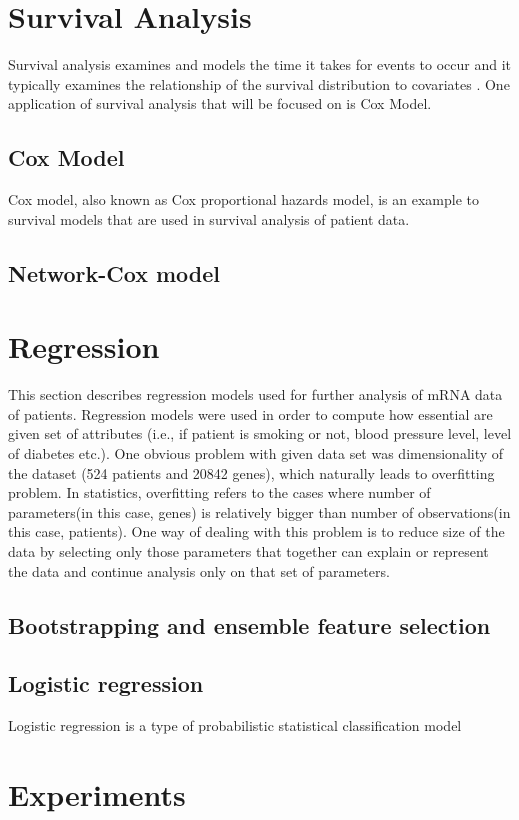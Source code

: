 \documentclass{ba-kecs}
\numberwithin{figure}{section}
\numberwithin{equation}{section}
\begin{document}
\section{Survival Analysis}
Survival analysis examines and models the time it takes for events to occur and it typically examines the relationship of the survival distribution to covariates \cite{cox}. One application of survival analysis that will be focused on is Cox Model.
\subsection{Cox Model}
Cox model, also known as Cox proportional hazards model, is an example to survival models that are used in survival analysis of patient data. 
\subsection{Network-Cox model}

\section{Regression}
This section describes regression models used for further analysis of mRNA data of patients. Regression models were used in order to compute how essential are given set of attributes (i.e., if patient is smoking or not, blood pressure level, level of diabetes etc.). One obvious problem with given data set was dimensionality of the dataset (524 patients and 20842 genes), which naturally leads to overfitting problem. In statistics, overfitting refers to the cases where number of parameters(in this case, genes) is relatively bigger than number of observations(in this case, patients). One way of dealing with this problem is to reduce size of the data by selecting only those parameters that together can explain or represent the data and continue analysis only on that set of parameters.
\subsection{Bootstrapping and ensemble feature selection}
\subsection{Logistic regression}
Logistic regression is a type of probabilistic statistical classification model


\section{Experiments}
\end{document}
